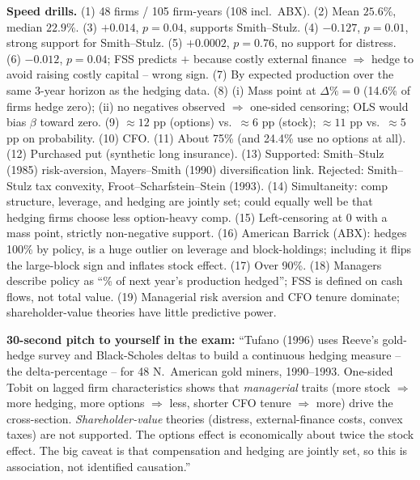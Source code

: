 \documentclass[11pt]{article}
\newcommand{\dP}{\Delta\%}
\begin{document}
\begin{answerbox}
\medskip
\textbf{Speed drills.}
(1) 48 firms / 105 firm-years (108 incl.\ ABX).
(2) Mean $25.6\%$, median $22.9\%$.
(3) $+0.014$, $p=0.04$, supports Smith--Stulz.
(4) $-0.127$, $p=0.01$, strong support for Smith--Stulz.
(5) $+0.0002$, $p=0.76$, no support for distress.
(6) $-0.012$, $p=0.04$; FSS predicts $+$ because costly external finance $\Rightarrow$ hedge to avoid raising costly capital -- wrong sign.
(7) By expected production over the same 3-year horizon as the hedging data.
(8) (i) Mass point at $\dP=0$ (14.6\% of firms hedge zero); (ii) no negatives observed $\Rightarrow$ one-sided censoring; OLS would bias $\beta$ toward zero.
(9) $\approx 12$ pp (options) vs.\ $\approx 6$ pp (stock); $\approx 11$ pp vs.\ $\approx 5$ pp on probability.
(10) CFO.
(11) About 75\% (and 24.4\% use no options at all).
(12) Purchased put (synthetic long insurance).
(13) Supported: Smith--Stulz (1985) risk-aversion, Mayers--Smith (1990) diversification link. Rejected: Smith--Stulz tax convexity, Froot--Scharfstein--Stein (1993).
(14) Simultaneity: comp structure, leverage, and hedging are jointly set; could equally well be that hedging firms choose less option-heavy comp.
(15) Left-censoring at 0 with a mass point, strictly non-negative support.
(16) American Barrick (ABX): hedges 100\% by policy, is a huge outlier on leverage and block-holdings; including it flips the large-block sign and inflates stock effect.
(17) Over 90\%.
(18) Managers describe policy as ``\% of next year's production hedged''; FSS is defined on cash flows, not total value.
(19) Managerial risk aversion and CFO tenure dominate; shareholder-value theories have little predictive power.
\end{answerbox}

\vspace{1em}
\begin{keybox}
\textbf{30-second pitch to yourself in the exam:} ``Tufano (1996) uses Reeve's gold-hedge survey and Black-Scholes deltas to build a continuous hedging measure -- the delta-percentage -- for 48 N.\ American gold miners, 1990--1993. One-sided Tobit on lagged firm characteristics shows that \emph{managerial} traits (more stock $\Rightarrow$ more hedging, more options $\Rightarrow$ less, shorter CFO tenure $\Rightarrow$ more) drive the cross-section. \emph{Shareholder-value} theories (distress, external-finance costs, convex taxes) are not supported. The options effect is economically about twice the stock effect. The big caveat is that compensation and hedging are jointly set, so this is association, not identified causation.''
\end{keybox}
\end{document}
